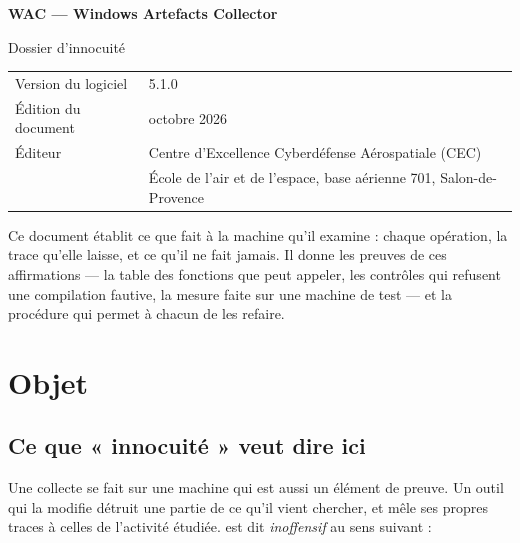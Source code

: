\documentclass[11pt,a4paper,oneside]{report}
\begin{document}

\thispagestyle{empty}
\vspace*{\fill}
{\color{marine}\Large\bfseries WAC — Windows Artefacts Collector}\par
{\color{bleu}Dossier d'innocuité}\par
\medskip
\begin{tabular}{@{}ll@{}}
Version du logiciel & 5.1.0 \\
Édition du document & octobre 2026 \\
Éditeur & Centre d'Excellence Cyberdéfense Aérospatiale (CEC) \\
        & École de l'air et de l'espace, base aérienne 701, Salon-de-Provence \\
\end{tabular}

\bigskip
{\small\color{gris}Ce document établit ce que \wac{} fait à la machine qu'il
examine : chaque opération, la trace qu'elle laisse, et ce qu'il ne fait
jamais. Il donne les preuves de ces affirmations — la table des fonctions que
 peut appeler, les contrôles qui refusent une compilation
fautive, la mesure faite sur une machine de test — et la procédure qui permet
à chacun de les refaire.}
\vspace*{2cm}
\clearpage

\tableofcontents

\chapter{Objet}

\section{Ce que « innocuité » veut dire ici}

Une collecte se fait sur une machine qui est aussi un élément de preuve. Un
outil qui la modifie détruit une partie de ce qu'il vient chercher, et mêle ses
propres traces à celles de l'activité étudiée. \wac{} est dit \emph{inoffensif}
au sens suivant :
\end{document}
